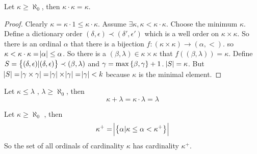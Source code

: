 \begin{theorem}
    Let $\kappa \geq \aleph_0$, then $\kappa \cdot \kappa = \kappa$.
\end{theorem}
\begin{proof}
    Clearly $\kappa = \kappa \cdot 1 \leq \kappa \cdot \kappa$. Assume $\exists \kappa, \kappa < \kappa \cdot \kappa$. Choose the minimum $\kappa$. Define a dictionary order $(\delta, \epsilon) \prec (\delta', \epsilon')$ which is a well order on $\kappa \times \kappa$. So there is an ordinal $\alpha$ that there is a bijection $f: (\kappa \times \kappa) \rightarrow (\alpha, <)$. so $\kappa < \kappa \cdot \kappa = \abs{\alpha} \leq \alpha$. So there is a $(\beta, \lambda) \in \kappa \times \kappa$ that $f((\beta, \lambda)) = \kappa$. Define $S = \set{(\delta, \epsilon)|(\delta, \epsilon) }\prec (\beta, \lambda)$ and $\gamma = \max\set{\beta, \gamma} + 1$. $\abs{S} = \kappa$. But $\abs{S} = \abs{\gamma \times \gamma} = \abs{\gamma} \times \abs{\gamma} = \abs{\gamma} < k$ because $\kappa$ is the minimal element. 
    

\end{proof}


\begin{theorem}
    Let $\kappa \leq \lambda$    , $\lambda \geq \aleph_0$, then
    \begin{equation}
        \kappa + \lambda = \kappa \cdot \lambda = \lambda
    \end{equation}
\end{theorem}

\begin{theorem}
    Let $\kappa \geq \aleph_0$    , then
    \begin{equation}
        \kappa^{+} = \abs{\set{\alpha | \kappa \leq \alpha < \kappa^{+}}}
    \end{equation}
    So the set of all ordinals of cardinality $\kappa$ has cardinality $\kappa^{+}$.
\end{theorem}















